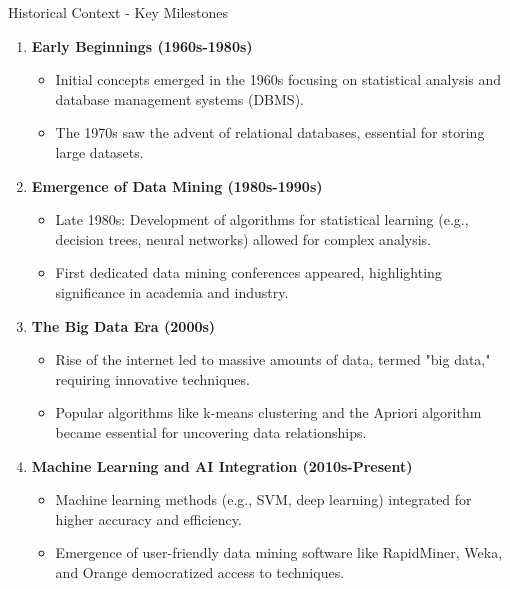 \documentclass[aspectratio=169]{beamer}
\begin{document}
\begin{frame}[fragile]{Historical Context - Key Milestones}
    \begin{enumerate}
        \item \textbf{Early Beginnings (1960s-1980s)}
            \begin{itemize}
                \item Initial concepts emerged in the 1960s focusing on statistical analysis and database management systems (DBMS).
                \item The 1970s saw the advent of relational databases, essential for storing large datasets.
            \end{itemize}

        \item \textbf{Emergence of Data Mining (1980s-1990s)}
            \begin{itemize}
                \item Late 1980s: Development of algorithms for statistical learning (e.g., decision trees, neural networks) allowed for complex analysis.
                \item First dedicated data mining conferences appeared, highlighting significance in academia and industry.
            \end{itemize}

        \item \textbf{The Big Data Era (2000s)}
            \begin{itemize}
                \item Rise of the internet led to massive amounts of data, termed "big data," requiring innovative techniques.
                \item Popular algorithms like k-means clustering and the Apriori algorithm became essential for uncovering data relationships.
            \end{itemize}

        \item \textbf{Machine Learning and AI Integration (2010s-Present)}
            \begin{itemize}
                \item Machine learning methods (e.g., SVM, deep learning) integrated for higher accuracy and efficiency.
                \item Emergence of user-friendly data mining software like RapidMiner, Weka, and Orange democratized access to techniques.
            \end{itemize}
    \end{enumerate}
\end{frame}
\end{document}
